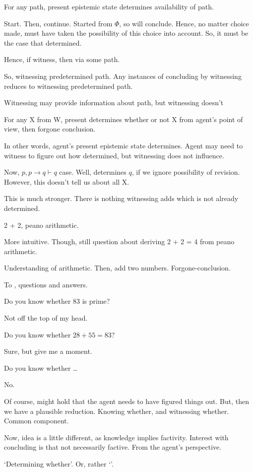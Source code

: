 \begin{note}
  \begin{proposition}
    For any path, present epistemic state determines availability of path.
  \end{proposition}

  Start.
  Then, continue.
  Started from \(\Phi\), so will conclude.
  Hence, no matter choice made, must have taken the possibility of this choice into account.
  So, it must be the case that determined.

  Hence, if witness, then via some path.

  So, witnessing predetermined path.
  Any instances of concluding by witnessing reduces to witnessing predetermined path.

  Witnessing may provide information about path, but witnessing doesn't 


  For any X from W,
  present determines whether or not X from agent's point of view, then forgone conclusion.

  In other words, agent's present epistemic state determines.
  Agent may need to witness to figure out how determined, but witnessing does not influence.
\end{note}

\begin{note}
  Now, \(p, p \rightarrow q \vdash q\) case.
  Well, determines \(q\), if we ignore possibility of revision.
  However, this doesn't tell us about all X.

  This is much stronger.
  There is nothing witnessing adds which is not already determined.

  2 + 2, peano arithmetic.

  More intuitive.
  Though, still question about deriving 2 + 2 = 4 from peano arithmetic.

  Understanding of arithmetic.
  Then, add two numbers.
  Forgone-conclusion.

\end{note}

\begin{note}
  To , questions and answers.

  Do you know whether \(83\) is prime?

  Not off the top of my head.

  Do you know whether \(28 + 55 = 83\)?

  Sure, but give me a moment.

  Do you know whether \dots

  No.

  Of course, might hold that the agent needs to have figured things out.
  But, then we have a plausible reduction.
  Knowing whether, and witnessing whether.
  Common component.

  Now, idea is a little different, as knowledge implies factivity.
  Interest with concluding is that not necessarily factive.
  From the agent's perspective.

  `Determining whether'.
  Or, rather `'.
\end{note}

